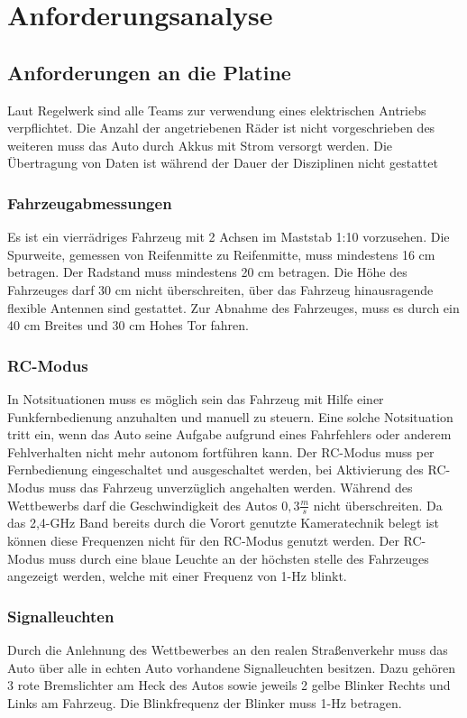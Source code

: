 \chapter{Anforderungsanalyse}
\section{Anforderungen an die Platine}
Laut Regelwerk sind alle Teams zur verwendung eines elektrischen Antriebs verpflichtet.
Die Anzahl der angetriebenen Räder ist nicht vorgeschrieben
des weiteren muss das Auto durch Akkus mit Strom versorgt werden.
Die Übertragung von Daten ist während der Dauer der Disziplinen nicht gestattet

\subsection{Fahrzeugabmessungen}
Es ist ein vierrädriges Fahrzeug mit 2 Achsen im Maststab 1:10 vorzusehen. Die Spurweite, gemessen von Reifenmitte zu
Reifenmitte, muss mindestens 16 cm betragen. Der Radstand muss mindestens 20 cm betragen.
Die Höhe des Fahrzeuges darf 30 cm nicht überschreiten, über das Fahrzeug hinausragende flexible Antennen sind gestattet.
Zur Abnahme des Fahrzeuges, muss es durch ein 40 cm Breites und 30 cm Hohes Tor fahren.


\subsection{RC-Modus}
In Notsituationen muss es möglich sein das Fahrzeug mit Hilfe einer Funkfernbedienung anzuhalten und manuell zu steuern. Eine solche Notsituation tritt ein, wenn
das Auto seine Aufgabe aufgrund eines Fahrfehlers oder anderem Fehlverhalten nicht mehr autonom fortführen kann.
Der RC-Modus muss per Fernbedienung eingeschaltet und ausgeschaltet werden, bei Aktivierung des RC-Modus muss das Fahrzeug unverzüglich angehalten werden.
Während des Wettbewerbs darf die Geschwindigkeit des Autos $0,3\frac{m}{s}$ nicht überschreiten.
Da das 2,4-GHz Band bereits durch die Vorort genutzte Kameratechnik belegt ist können diese Frequenzen nicht für den RC-Modus genutzt werden.
Der RC-Modus muss durch eine blaue Leuchte an der höchsten stelle des Fahrzeuges angezeigt werden, welche mit einer Frequenz von 1-Hz blinkt.

\subsection{Signalleuchten}
Durch die Anlehnung des Wettbewerbes an den realen Straßenverkehr muss das Auto über alle in echten Auto vorhandene Signalleuchten besitzen. 
Dazu gehören 3 rote Bremslichter am Heck des Autos sowie jeweils 2 gelbe Blinker Rechts und Links am Fahrzeug.  Die Blinkfrequenz der Blinker muss
1-Hz betragen.

